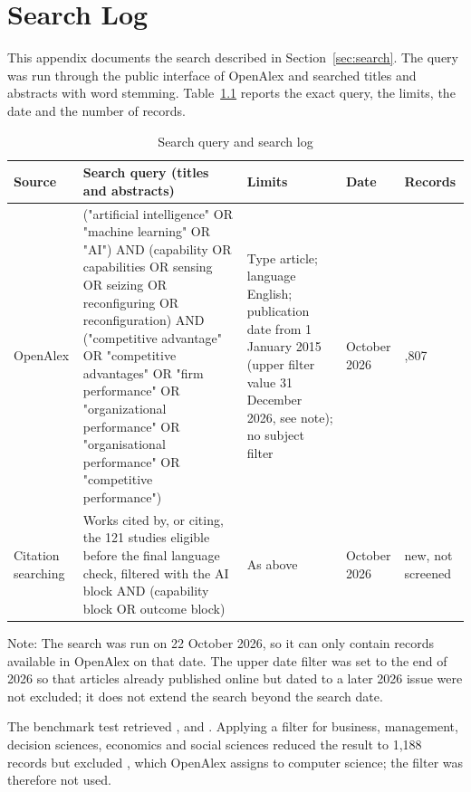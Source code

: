 %

\chapter{Search Log}
\label{AppendixA}

This appendix documents the search described in Section~\ref{sec:search}. The query was run through the public interface of OpenAlex and searched titles and abstracts with word stemming. Table~\ref{tab:searchlog} reports the exact query, the limits, the date and the number of records.

\begin{table}[htbp]
\centering
\caption{Search query and search log}
\label{tab:searchlog}
\footnotesize
\renewcommand{\arraystretch}{1.1}\setlength{\tabcolsep}{4pt}
\begin{tabularx}{\textwidth}{|>{\raggedright\arraybackslash}p{2.0cm}|>{\raggedright\arraybackslash}X|>{\raggedright\arraybackslash}p{2.9cm}|>{\raggedright\arraybackslash}p{1.6cm}|>{\raggedright\arraybackslash}p{1.6cm}|}
\hline
\textbf{Source} & \textbf{Search query (titles and abstracts)} & \textbf{Limits} & \textbf{Date} & \textbf{Records} \\
\hline
OpenAlex & {\ttfamily\scriptsize ("artificial intelligence" OR "machine learning" OR "AI") AND (capability OR capabilities OR sensing OR seizing OR reconfiguring OR reconfiguration) AND ("competitive advantage" OR "competitive advantages" OR "firm performance" OR "organizational performance" OR "organisational performance" OR "competitive performance")} & Type article; language English; publication date from 1 January 2015 (upper filter value 31 December 2026, see note); no subject filter & 22 October 2026 & 1,807 \\ \hline
Citation searching & Works cited by, or citing, the 121 studies eligible before the final language check, filtered with the AI block AND (capability block OR outcome block) & As above & 22 October 2026 & 678 new, not screened \\
\hline
\end{tabularx}
\par\smallskip
{\footnotesize\raggedright Note: The search was run on 22 October 2026, so it can only contain records available in OpenAlex on that date. The upper date filter was set to the end of 2026 so that articles already published online but dated to a later 2026 issue were not excluded; it does not extend the search beyond the search date.\par}
\end{table}

The benchmark test retrieved \textcite{mikalef2021ai}, \textcite{chen2022} and \textcite{shao2026}. Applying a filter for business, management, decision sciences, economics and social sciences reduced the result to 1,188 records but excluded \textcite{chen2022}, which OpenAlex assigns to computer science; the filter was therefore not used.
